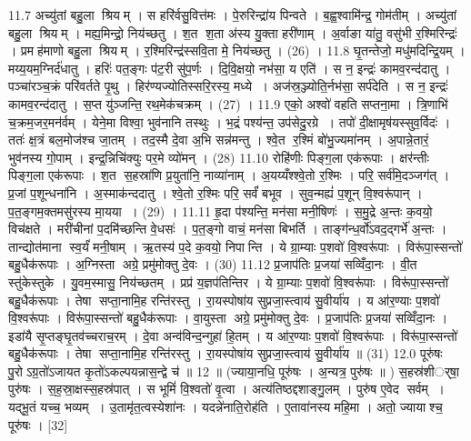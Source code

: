 11.7
अच्यु॑तां बहु॒ला श्रियम् । स हरि॑र्वसु॒वित्त॑मः । पे॒रुरिन्द्रा॑य पिन्वते । ब॒ह्व॒श्वामि॑न्द्र॒ गोम॑तीम् । अच्यु॑तां बहु॒ला श्रियम् । मह्य॒मिन्द्रो॒ निय॑च्छतु । श॒त श॒ता अ॑स्य यु॒क्ता हरी॑णाम् । अ॒र्वाङा या॑तु॒ वसु॑भी र॒श्मिरिन्द्रः॑ । प्रमह॑माणो बहु॒ला श्रियम् । र॒श्मिरिन्द्र॑स्सवि॒ता मे॒ निय॑च्छतु । (26) ।
11.8
घृ॒तन्तेजो॒ मधु॑मदिन्द्रि॒यम् । मय्य॒यम॒ग्निर्द॑धातु । हरिः॑ पत॒ङ्गः प॑ट॒री सु॑प॒र्णः । दि॒वि॒क्षयो॒ नभ॑सा॒ य एति॑ । स न॒ इन्द्रः॑ कामव॒रन्द॑दातु । पञ्चा॑रञ्च॒क्रं परि॑वर्तते पृ॒थु । हिर॑ण्यज्योतिस्सरि॒रस्य॒ मध्ये । अज॑स्र॒ञ्ज्योति॒र्नभ॑सा॒ सर्प॑देति । स न॒ इन्द्रः॑ कामव॒रन्द॑दातु । स॒प्त यु॑ञ्जन्ति॒ रथ॒मेक॑चक्रम् । (27) ।
11.9
एको॒ अश्वो॑ वहति सप्तना॒मा । त्रि॒णाभि॑ च॒क्रम॒जर॒मन॑र्वम् । येने॒मा विश्वा॒ भुव॑नानि तस्थुः । भ॒द्रं पश्य॑न्त॒ उप॑सेदु॒रग्रे । तपो॑ दी॒क्षामृष॑यस्सुव॒र्विदः॑ । ततः॑ क्ष॒त्रं बल॒मोज॑श्च जा॒तम् । तद॒स्मै दे॒वा अ॒भि सन्न॑मन्तु । श्वे॒त र॒श्मिं बो॑भु॒ज्यमा॑नम् । अ॒पान्ने॒तारं॒ भुव॑नस्य गो॒पाम् । इन्द्र॒न्निचि॑क्युः पर॒मे व्यो॑मन् । (28)
11.10
रोहि॑णीः पिङ्ग॒ला एक॑रूपाः । क्षर॑न्तीः पिङ्ग॒ला एक॑रूपाः । श॒त स॒हस्रा॑णि प्र॒युता॑नि॒ नाव्या॑नाम् । अ॒यय्यँश्श्वे॒तो र॒श्मिः । परि॒ सर्व॑मि॒दञ्जग॑त् । प्र॒जां प॒शून्धना॑नि । अ॒स्माक॑न्ददातु । श्वे॒तो र॒श्मिः परि॒ सर्वं॑ बभूव । सुव॒न्मह्यं॑ प॒शून् वि॒श्वरू॑पान् । प॒त॒ङ्गम॒क्तमसु॑रस्य मा॒यया । (29) ।
11.11
हृ॒दा प॑श्यन्ति॒ मन॑सा मनी॒षिणः॑ । स॒मु॒द्रे अ॒न्तः क॒वयो॒ विच॑क्षते । मरी॑चीनां प॒दमि॑च्छन्ति वे॒धसः॑ । प॒त॒ङ्गो वाचं॒ मन॑सा बिभर्ति । ताङ्ग॑न्ध॒र्वो॑ऽवद॒द्गर्भे॑ अ॒न्तः । तान्द्योत॑माना स्व॒र्यं॑ मनी॒षाम् । ऋ॒तस्य॑ प॒दे क॒वयो॒ निपान्ति । ये ग्रा॒म्याः प॒शवो॑ वि॒श्वरू॑पाः । विरू॑पा॒स्सन्तो॑ बहु॒धैक॑रूपाः । अ॒ग्निस्ता अग्रे॒ प्रमु॑मोक्तु दे॒वः । (30)
11.12
प्र॒जाप॑तिः प्र॒जया॑ सव्विँदा॒नः । वी॒त स्तु॑केस्तुके । यु॒वम॒स्मासु॒ निय॑च्छतम् । प्रप्र॑ य॒ज्ञप॑तिन्तिर । ये ग्रा॒म्याः प॒शवो॑ वि॒श्वरू॑पाः । विरू॑पा॒स्सन्तो॑ बहु॒धैक॑रूपाः । तेषा सप्ता॒नामि॒ह रन्ति॑रस्तु । रा॒यस्पोषा॑य सुप्रजा॒स्त्वाय॑ सु॒वीर्या॑य । य आ॑र॒ण्याः प॒शवो॑ वि॒श्वरू॑पाः । विरू॑पा॒स्सन्तो॑ बहु॒धैक॑रूपाः । वा॒युस्ता अग्रे॒ प्रमु॑मोक्तु दे॒वः । प्र॒जाप॑तिः प्र॒जया॑ सव्विँदा॒नः । इडा॑यै सृ॒प्तङ्घृ॒तव॑च्चराच॒रम् । दे॒वा अन्व॑विन्द॒न्गुहा॑ हि॒तम् । य आ॑र॒ण्याः प॒शवो॑ वि॒श्वरू॑पाः । विरू॑पा॒स्सन्तो॑ बहु॒धैक॑रूपाः । तेषा सप्ता॒नामि॒ह रन्ति॑रस्तु । रा॒यस्पोषा॑य सुप्रजा॒स्त्वाय॑ सु॒वीर्या॑य ॥ (31)
12.0
पूरु॑षः पु॒रोऽग्र॒तो॑ऽजायत कृ॒तो॑ऽकल्पयन्नास॒न्द्वे च॑ ॥ 12 ॥ (ज्याया॒नधि॒ पूरु॑षः । अ॒न्यत्र॒ पुरु॑षः ॥ )
स॒हस्र॑शीर््षा॒ पुरु॑षः । स॒ह॒स्रा॒क्षस्स॒हस्र॑पात् । स भूमिं॑ वि॒श्वतो॑ वृ॒त्वा । अत्य॑तिष्ठद्दशाङ्गु॒लम् । पुरु॑ष ए॒वेद सर्वम् । यद्भू॒तं यच्च॒ भव्यम् । उ॒तामृ॑त॒त्वस्येशा॑नः । यदन्ने॑नाति॒रोह॑ति । ए॒तावा॑नस्य महि॒मा । अतो॒ ज्यायाश्च॒ पूरु॑षः । [32]
